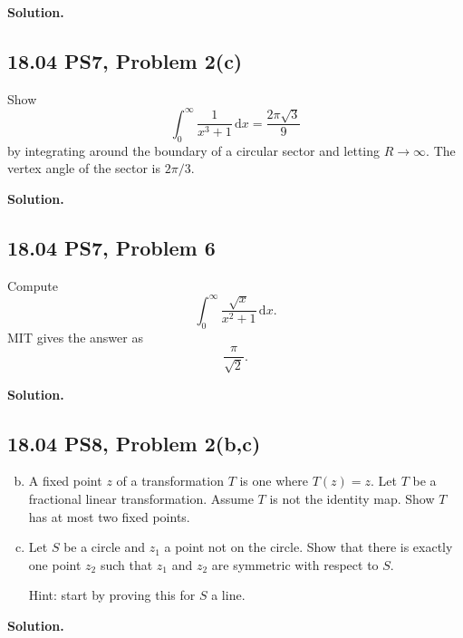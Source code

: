 \documentclass{article}
\newcommand{\dd}{\mathrm{d}}
\newenvironment{solution}{%
  \par\medskip\noindent\textbf{Solution.}\par
}{\par\medskip}
\begin{document}
\begin{solution}
\end{solution}

\subsection*{18.04 PS7, Problem 2(c)}

Show
\[
  \int_0^\infty \frac{1}{x^3+1}\,\dd x
  =
  \frac{2\pi\sqrt{3}}{9}
\]
by integrating around the boundary of a circular sector and letting
$R\to\infty$. The vertex angle of the sector is $2\pi/3$.

\begin{solution}
\end{solution}

\subsection*{18.04 PS7, Problem 6}

Compute
\[
  \int_0^\infty\frac{\sqrt{x}}{x^2+1}\,\dd x.
\]
MIT gives the answer as
\[
  \frac{\pi}{\sqrt{2}}.
\]

\begin{solution}
\end{solution}

\subsection*{18.04 PS8, Problem 2(b,c)}

\begin{enumerate}[(a)]
  \setcounter{enumi}{1}
  \item A fixed point $z$ of a transformation $T$ is one where $T(z)=z$.
  Let $T$ be a fractional linear transformation. Assume $T$ is not the
  identity map. Show $T$ has at most two fixed points.

  \item Let $S$ be a circle and $z_1$ a point not on the circle. Show that
  there is exactly one point $z_2$ such that $z_1$ and $z_2$ are symmetric
  with respect to $S$.

  Hint: start by proving this for $S$ a line.
\end{enumerate}

\begin{solution}
\end{solution}
\end{document}
